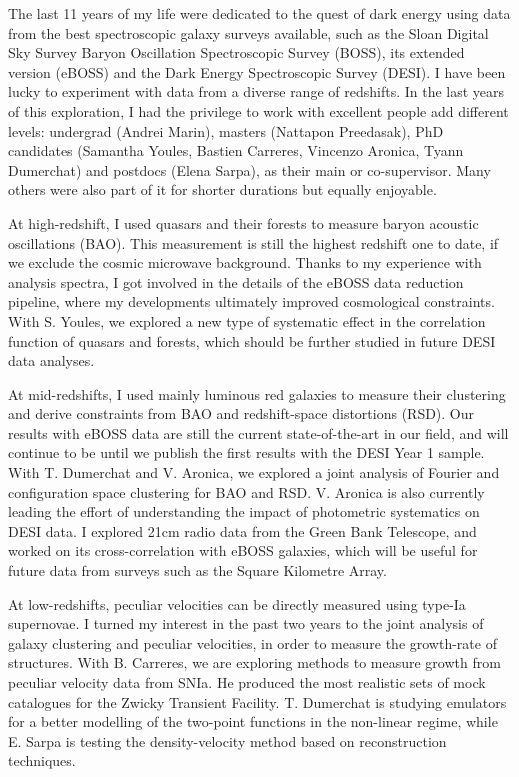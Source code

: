 The last 11 years of my life were dedicated to the quest of dark energy 
using data from the best spectroscopic galaxy surveys available, 
such as the Sloan Digital Sky Survey Baryon Oscillation Spectroscopic Survey (BOSS),
its extended version (eBOSS) and the Dark Energy Spectroscopic Survey (DESI).
I have been lucky to experiment with data from a diverse range of redshifts. 
In the last years of this exploration, I had the privilege to work with excellent people 
add different levels: undergrad (Andrei Marin), masters (Nattapon Preedasak), 
PhD candidates (Samantha Youles, Bastien Carreres, Vincenzo Aronica, 
Tyann Dumerchat) and postdocs (Elena Sarpa), 
as their main or co-supervisor. 
Many others were also part of it for shorter durations but equally enjoyable. 

At high-redshift, I used quasars and their \lya forests to measure baryon acoustic oscillations (BAO).
This measurement is still the highest redshift one to date, if we exclude the cosmic microwave background.  
Thanks to my experience with analysis spectra, I got involved in the details of the eBOSS data reduction 
pipeline, where my developments ultimately improved cosmological constraints.
With S. Youles, we explored a new type of systematic effect in the correlation function 
of quasars and forests, which should be further studied in future DESI data analyses. 

At mid-redshifts, I used mainly luminous red galaxies to measure their clustering 
and derive constraints from BAO and redshift-space distortions (RSD). 
Our results with eBOSS data are still the current state-of-the-art in our field, 
and will continue to be until we publish the first results with the DESI Year 1 sample. 
With T. Dumerchat and V. Aronica, we explored a joint analysis of Fourier and configuration 
space clustering for BAO and RSD. 
V. Aronica is also currently leading the effort of understanding the impact 
of photometric systematics on DESI data. 
I explored 21cm radio data from the Green Bank Telescope, and worked on its 
cross-correlation with eBOSS galaxies, which will be useful for future data from 
surveys such as the Square Kilometre Array. 

At low-redshifts, peculiar velocities can be directly measured using type-Ia supernovae. 
I turned my interest in the past two years to the joint analysis of galaxy clustering and peculiar velocities, 
in order to measure the growth-rate of structures. 
With B. Carreres, we are exploring methods to measure growth from peculiar velocity data from SNIa.
He produced the most realistic sets of mock catalogues for the Zwicky Transient Facility.
T. Dumerchat is studying emulators for a better modelling of the two-point functions in the non-linear 
regime, while E. Sarpa is testing the density-velocity method based on reconstruction techniques.

